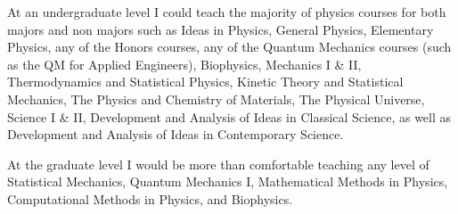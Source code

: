 \documentclass[11pt]{article}
\begin{document}
At an undergraduate level I could teach the majority of physics courses for both majors and non majors such as Ideas in Physics, General Physics, Elementary Physics, any of the Honors courses, any of the Quantum Mechanics courses (such as the QM for Applied Engineers), Biophysics, Mechanics I \& II, Thermodynamics and Statistical Physics, Kinetic Theory and Statistical Mechanics, The Physics and Chemistry of Materials, The Physical Universe, Science I \& II, Development and Analysis of Ideas in Classical Science, as well as Development and Analysis of Ideas in Contemporary Science.

At the graduate level I would be more than comfortable teaching any level of Statistical Mechanics, Quantum Mechanics I, Mathematical Methods in Physics, Computational Methods in Physics, and Biophysics.
\end{document}
